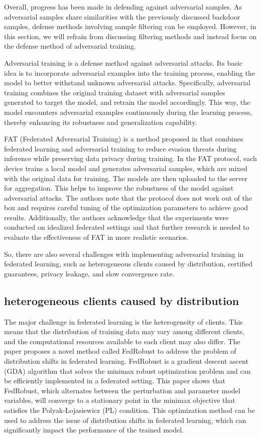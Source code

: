 \documentclass[conference]{IEEEtran}
\begin{document}
Overall, progress has been made in defending against adversarial samples.
As adversarial samples share similarities with the previously discussed backdoor
samples, defense methods involving sample filtering can be employed.
However, in this section, we will refrain from discussing filtering methods
and instead focus on the defense method of adversarial training.

Adversarial training is a defense method against adversarial attacks.
Its basic idea is to incorporate adversarial examples into the training process,
enabling the model to better withstand unknown adversarial attacks.
Specifically, adversarial training combines the original training dataset
with adversarial samples generated to target the model, and retrain the
model accordingly. This way, the model encounters adversarial examples
continuously during the learning process, thereby enhancing its robustness
and generalization capability.

FAT (Federated Adversarial Training) is a method proposed in \cite{b31} that
combines federated learning and adversarial training to reduce evasion
threats during inference while preserving data privacy during training.
In the FAT protocol, each device trains a local model and generates adversarial
samples, which are mixed with the original data for training.
The models are then uploaded to the server for aggregation.
This helps to improve the robustness of the model against adversarial attacks.
The authors note that the protocol does not work out of the box and requires careful
tuning of the optimization parameters to achieve good results. Additionally, the authors
acknowledge that the experiments were conducted on idealized federated settings and that
further research is needed to evaluate the effectiveness of FAT in more realistic scenarios.

So, there are also several challenges with implementing adversarial training in federated learning,
such as heterogeneous clients caused by distribution, certified guarantees, privacy leakage, and slow convergence rate.


\subsection{heterogeneous clients caused by distribution}  
The major challenge in federated learning is the heterogeneity of clients.  
This means that the distribution of training data may vary among different clients, 
and the computational resources available to each client may also differ.
The paper\cite{b101} proposes a novel method called FedRobust to address the problem of
distribution shifts in federated learning. FedRobust is a gradient descent ascent
(GDA) algorithm that solves the minimax robust optimization problem and can be
efficiently implemented in a federated setting. This paper shows that FedRobust,
which alternates between the perturbation and parameter model variables,
will converge to a stationary point in the minimax objective that satisfies
the Polyak-Łojasiewicz (PL) \cite{b102} condition. This optimization method can be used
to address the issue of distribution shifts in federated learning,
which can significantly impact the performance of the trained model.
\end{document}
